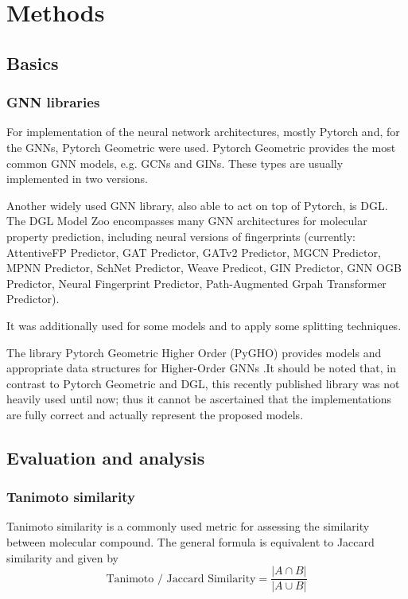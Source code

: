 \chapter{Methods}

\section{Basics}

\subsection{GNN libraries}

For implementation of the neural network architectures, mostly Pytorch \cite{Paszke.03.12.2019} and, for the GNNs, Pytorch Geometric were used. Pytorch Geometric provides the most common GNN models, e.g. GCNs and GINs. These types are usually implemented in two versions.

Another widely used GNN library, also able to act on top of Pytorch, is DGL.
The DGL Model Zoo encompasses many GNN architectures for molecular property prediction, including neural versions of fingerprints (currently: AttentiveFP Predictor, GAT Predictor, GATv2 Predictor, MGCN Predictor, MPNN Predictor, SchNet Predictor, Weave Predicot, GIN Predictor, GNN OGB Predictor, Neural Fingerprint Predictor, Path-Augmented Grpah Transformer Predictor).

It was additionally used for some models and to apply some splitting techniques.

The library Pytorch Geometric Higher Order (PyGHO) provides models and appropriate data structures for Higher-Order GNNs \cite{Wang.28.11.2023}.It should be noted that, in contrast to Pytorch Geometric and DGL, this recently published library was not heavily used until now; thus it cannot be ascertained that the implementations are fully correct and actually represent the proposed models.

\section{Evaluation and analysis}

\subsection{Tanimoto similarity}

Tanimoto similarity is a commonly used metric for assessing the similarity between molecular compound.
The general formula is equivalent to Jaccard similarity and given by
\[
\text{Tanimoto / Jaccard Similarity} = \frac{|A \cap B|}{|A \cup B|}
\]


